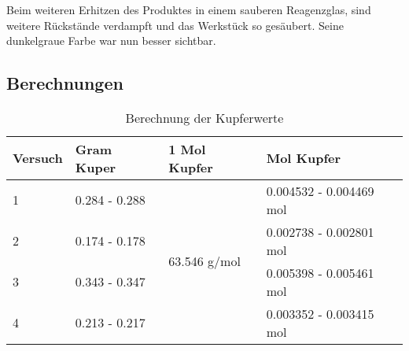 \documentclass[11pt,paper=a4,final]{scrartcl}
\begin{document}
{Beim weiteren Erhitzen des Produktes in einem sauberen Reagenzglas, sind
weitere R\"uckst\"ande verdampft und das Werkst\"uck so ges\"aubert. Seine
dunkelgraue Farbe war nun besser sichtbar.
\subsection{Berechnungen}
\begin{table}[h!]
  \begin{tabular}{|l|l|l|l|} \hline
    \bf Versuch & \bf Gram Kuper & \bf 1 Mol Kupfer & \bf Mol Kupfer \\ \hline
    1	& 0.284 - 0.288	& \multirow{4}{*}{63.546 g/mol}	& 0.004532 - 0.004469
    mol \\ \cline{1-2} \cline{4-4}
    2	& 0.174 - 0.178 & & 0.002738 - 0.002801 mol \\ \cline{1-2} \cline{4-4}
    3 	& 0.343 - 0.347 & & 0.005398 - 0.005461 mol \\ \cline{1-2} \cline{4-4}
    4	& 0.213 - 0.217 & & 0.003352 - 0.003415 mol \\ \hline
  \end{tabular}
  \caption{Berechnung der Kupferwerte}
  \label{tab:kupfer}
\end{table}

}
\end{document}
